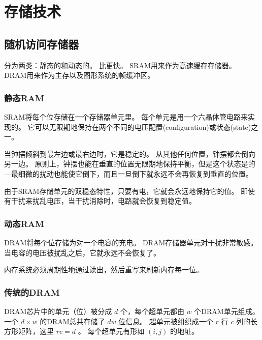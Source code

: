 
\section{存储技术}
{
    \subsection{随机访问存储器}
    {
        分为两类：静态的和动态的。
        比更快。
        SRAM用来作为高速缓存存储器。
        DRAM用来作为主存以及图形系统的帧缓冲区。

        \subsubsection{静态RAM}
        {
            SRAM将每个位存储在一个存储器单元里。
            每个单元是用一个六晶体管电路来实现的。
            它可以无限期地保持在两个不同的电压配置(configuration)或状态(state)之一。

            当钟摆倾斜到最左边或最右边时，它是稳定的。
            从其他任何位置，钟摆都会倒向另一边。
            原则上，钟摆也能在垂直的位置无限期地保持平衡，但是这个状态是的---最细微的扰动也能使它倒下，而且一旦倒下就永远不会再恢复到垂直的位置。

            由于SRAM存储单元的双稳态特性，只要有电，它就会永远地保持它的值。
            即使有干扰来扰乱电压，当干扰消除时，电路就会恢复到稳定值。
        }

        \subsubsection{动态RAM}
        {
            DRAM将每个位存储为对一个电容的充电。
            DRAM存储器单元对干扰非常敏感。
            当电容的电压被扰乱之后，它就永远不会恢复了。

            内存系统必须周期性地通过读出，然后重写来刷新内存每一位。
        }

        \subsubsection{传统的DRAM}
        {
            DRAM芯片中的单元（位）被分成 $d$ 个，每个超单元都由 $w$ 个DRAM单元组成。
            一个 $d \times w$ 的DRAM总共存储了 $dw$ 位信息。
            超单元被组织成一个 $r$ 行 $c$ 列的长方形矩阵，这里 $rc = d$ 。
            每个超单元有形如 $(i, j)$ 的地址。

}}}
